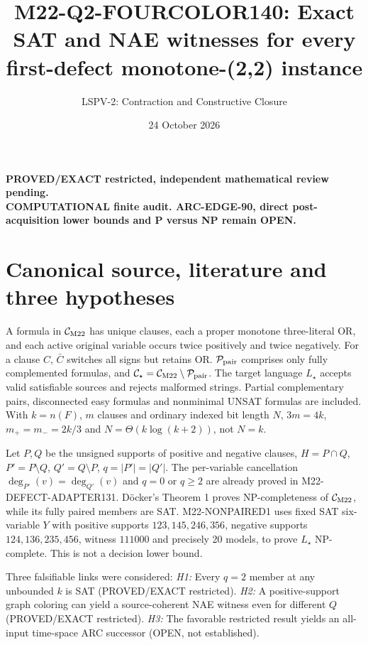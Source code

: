 \documentclass[11pt]{article}
\title{M22-Q2-FOURCOLOR140: Exact SAT and NAE witnesses for every first-defect monotone-(2,2) instance}
\author{LSPV-2: Contraction and Constructive Closure}
\date{24 October 2026}
\begin{document}
\maketitle
\begin{center}\textbf{PROVED/EXACT restricted, independent mathematical review pending.}\\
\textbf{COMPUTATIONAL finite audit. ARC-EDGE-90, direct post-acquisition lower bounds and P versus NP remain OPEN.}\end{center}

\section{Canonical source, literature and three hypotheses}
A formula in $\mathcal C_{\rm M22}$ has unique clauses, each
a proper monotone three-literal OR, and each active original
variable occurs twice positively and twice negatively.
For a clause $C$, $\bar C$ switches all signs but retains OR.
$\mathcal P_{\rm pair}$ comprises only fully complemented
formulas, and $\mathcal C_\star=\mathcal C_{\rm M22}\setminus
\mathcal P_{\rm pair}$. The target language $L_\star$ accepts
valid satisfiable sources and rejects malformed strings.
Partial complementary pairs, disconnected easy formulas and
nonminimal UNSAT formulas are included. With $k=n(F)$,
$m$ clauses and ordinary indexed bit length $N$,
$3m=4k$, $m_+=m_-=2k/3$ and
$N=\Theta(k\log(k+2))$, not $N=k$.

Let $P,Q$ be the unsigned supports of positive and negative
clauses, $H=P\cap Q$, $P'=P\setminus Q$, $Q'=Q\setminus P$,
$q=|P'|=|Q'|$. The per-variable cancellation
$\deg_{P'}(v)=\deg_{Q'}(v)$ and $q=0$ or $q\ge2$ are already
proved in M22-DEFECT-ADAPTER131. D\"ocker's Theorem 1 proves
NP-completeness of $\mathcal C_{\rm M22}$, while its fully
paired members are SAT. M22-NONPAIRED1 uses fixed SAT
six-variable $Y$ with positive supports
$123,145,246,356$, negative supports $124,136,235,456$,
witness $111000$ and precisely 20 models, to prove
$L_\star$ NP-complete. This is not a decision lower bound.

Three falsifiable links were considered:
\emph{H1:} Every $q=2$ member at any unbounded $k$ is SAT
(PROVED/EXACT restricted).
\emph{H2:} A positive-support graph coloring can yield
a source-coherent NAE witness even for different $Q$
(PROVED/EXACT restricted).
\emph{H3:} The favorable restricted result yields an
all-input time-space ARC successor (OPEN, not established).
\end{document}
